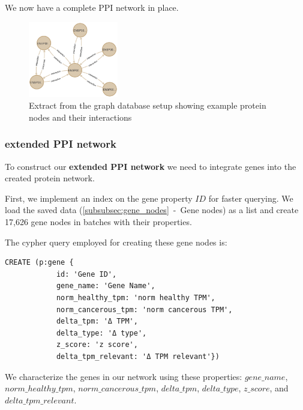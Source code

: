 We now have a complete PPI network in place.\\

\begin{figure}[h]
    \centering
    \includegraphics[width=0.35\textwidth]{figures/03_03_Basic_Network}
    \caption{Extract from the graph database setup showing example protein nodes and their interactions}
    \label{fig:03_03_Basic_Network}
\end{figure}
\vspace{\baselineskip}


\subsubsection*{extended PPI network} \label{subsubsec:extended_ppi_network}
To construct our \textbf{extended PPI network} we need to integrate genes into the created protein network.

First, we implement an index on the gene property $ID$ for faster querying.
We load the saved data (\cref{subsubsec:gene_nodes}~-~Gene nodes) as a list and create 17,626 gene nodes
in batches with their properties.

The cypher query employed for creating these gene nodes is:
\begin{lstlisting}[language=Cypher, label={lst:gene_nodes}]
    CREATE (p:gene {
            id: 'Gene ID',
            gene_name: 'Gene Name',
            norm_healthy_tpm: 'norm healthy TPM',
            norm_cancerous_tpm: 'norm cancerous TPM',
            delta_tpm: 'Δ TPM',
            delta_type: 'Δ type',
            z_score: 'z score',
            delta_tpm_relevant: 'Δ TPM relevant'})
\end{lstlisting}

We characterize the genes in our network using these properties:
$gene\_name$, $norm\_healthy\_tpm$, $norm\_cancerous\_tpm$, $delta\_tpm$, $delta\_type$, $z\_score$, and $delta\_tpm\_relevant$.


